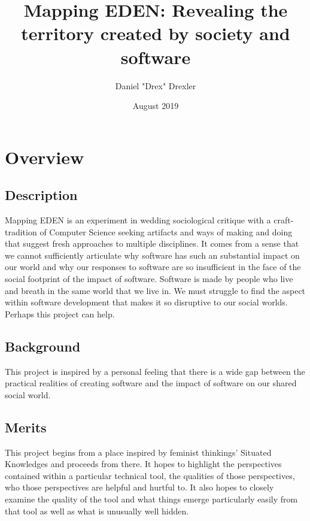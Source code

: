 \documentclass[a4paper,man,natbib]{apa6}
\title{Mapping EDEN: Revealing the territory created by society and software}
\author{Daniel "Drex" Drexler}
\affiliation{Center for Science, Technology and Society at Drexel University}
\date{August 2019}
\begin{document}
   \maketitle
   \section*{Overview}
   \subsection*{Description}
   Mapping EDEN is an experiment in wedding sociological critique with a craft-tradition of Computer Science seeking artifacts and ways of making and doing that suggest fresh approaches to multiple disciplines. It comes from a sense that we cannot sufficiently articulate why software has such an substantial impact on our world and why our responses to software are so insufficient in the face of the social footprint of the impact of software. Software is made by people who live and breath in the same world that we live in. We must struggle to find the aspect within software development that makes it so disruptive to our social worlds. Perhaps this project can help.
   \subsection*{Background}
   This project is inspired by a personal feeling that there is a wide gap between the practical realities of creating software and the impact of software on our shared social world. 
   \subsection*{Merits}
   This project begins from a place inspired by feminist thinkings' Situated Knowledges and proceeds from there. It hopes to highlight the perspectives contained within a particular technical tool, the qualities of those perspectives, who those perspectives are helpful and hurtful to. It also hopes to closely examine the quality of the tool and what things emerge particularly easily from that tool as well as what is unusually well hidden.
\end{document}
